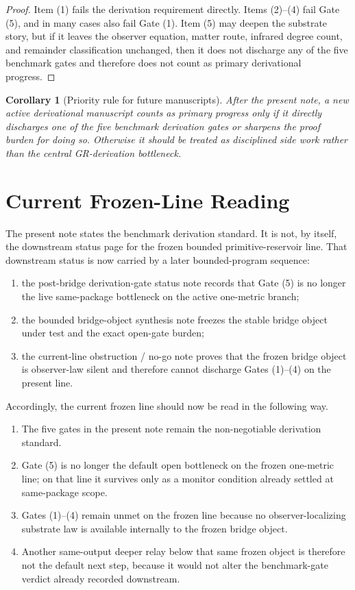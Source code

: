 \documentclass[11pt]{article}
\newtheorem{corollary}{Corollary}
\begin{document}
\begin{proof}
Item (1) fails the derivation requirement directly. Items (2)--(4) fail Gate (5), and in many cases also fail Gate (1). Item (5) may deepen the substrate story, but if it leaves the observer equation, matter route, infrared degree count, and remainder classification unchanged, then it does not discharge any of the five benchmark gates and therefore does not count as primary derivational progress.
\end{proof}

\begin{corollary}[Priority rule for future manuscripts]
After the present note, a new active derivational manuscript counts as primary progress only if it directly discharges one of the five benchmark derivation gates or sharpens the proof burden for doing so. Otherwise it should be treated as disciplined side work rather than the central GR-derivation bottleneck.
\end{corollary}

\section{Current Frozen-Line Reading}

The present note states the benchmark derivation standard. It is not, by itself, the downstream status page for the frozen bounded primitive-reservoir line. That downstream status is now carried by a later bounded-program sequence:
\begin{enumerate}
    \item the post-bridge derivation-gate status note records that Gate (5) is no longer the live same-package bottleneck on the active one-metric branch;
    \item the bounded bridge-object synthesis note freezes the stable bridge object under test and the exact open-gate burden;
    \item the current-line obstruction / no-go note proves that the frozen bridge object is observer-law silent and therefore cannot discharge Gates (1)--(4) on the present line.
\end{enumerate}

Accordingly, the current frozen line should now be read in the following way.
\begin{enumerate}
    \item The five gates in the present note remain the non-negotiable derivation standard.
    \item Gate (5) is no longer the default open bottleneck on the frozen one-metric line; on that line it survives only as a monitor condition already settled at same-package scope.
    \item Gates (1)--(4) remain unmet on the frozen line because no observer-localizing substrate law is available internally to the frozen bridge object.
    \item Another same-output deeper relay below that same frozen object is therefore not the default next step, because it would not alter the benchmark-gate verdict already recorded downstream.
\end{enumerate}
\end{document}
